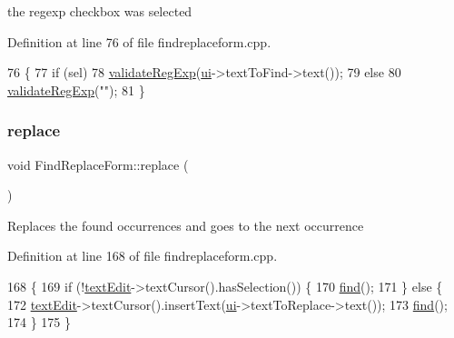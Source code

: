 the regexp checkbox was selected 



Definition at line 76 of file findreplaceform.\+cpp.


\begin{DoxyCode}
76                                              \{
77     \textcolor{keywordflow}{if} (sel)
78         \hyperlink{class_find_replace_form_a2867ac36c3f8c9accb7f0c010ee74522}{validateRegExp}(\hyperlink{class_find_replace_form_a9bf9e9096feff863dcd6c2a989e07d2c}{ui}->textToFind->text());
79     \textcolor{keywordflow}{else}
80         \hyperlink{class_find_replace_form_a2867ac36c3f8c9accb7f0c010ee74522}{validateRegExp}(\textcolor{stringliteral}{""});
81 \}
\end{DoxyCode}
\mbox{\label{class_find_replace_form_abe7bcb37012970be0e5bc6e7016cb0a3}} 
\subsubsection{\texorpdfstring{replace}{replace}}
{\footnotesize\ttfamily void Find\+Replace\+Form\+::replace (\begin{DoxyParamCaption}{ }\end{DoxyParamCaption})\hspace{0.3cm}{\ttfamily [slot]}}

Replaces the found occurrences and goes to the next occurrence 

Definition at line 168 of file findreplaceform.\+cpp.


\begin{DoxyCode}
168                               \{
169     \textcolor{keywordflow}{if} (!\hyperlink{class_find_replace_form_a6ddb6c32035bcafdd085c457c1ac125c}{textEdit}->textCursor().hasSelection()) \{
170         \hyperlink{class_find_replace_form_ad2f83207e2b70f30680049286033915b}{find}();
171     \} \textcolor{keywordflow}{else} \{
172         \hyperlink{class_find_replace_form_a6ddb6c32035bcafdd085c457c1ac125c}{textEdit}->textCursor().insertText(\hyperlink{class_find_replace_form_a9bf9e9096feff863dcd6c2a989e07d2c}{ui}->textToReplace->text());
173         \hyperlink{class_find_replace_form_ad2f83207e2b70f30680049286033915b}{find}();
174     \}
175 \}
\end{DoxyCode}
\mbox{\label{class_find_replace_form_aec41613e2aaac883f638d032d4d90d55}} 
